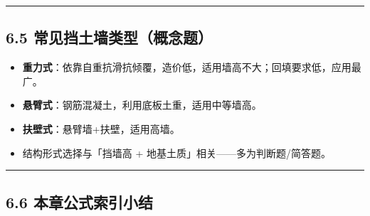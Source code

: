 \documentclass[
]{article}
\providecommand{\tightlist}{%
  \setlength{\itemsep}{0pt}\setlength{\parskip}{0pt}}
\begin{document}
\begin{center}\rule{0.5\linewidth}{0.5pt}\end{center}

\subsection{6.5
常见挡土墙类型（概念题）}\label{ux5e38ux89c1ux6321ux571fux5899ux7c7bux578bux6982ux5ff5ux9898}

\begin{itemize}
\tightlist
\item
  \textbf{重力式}：依靠自重抗滑抗倾覆，造价低，适用墙高不大；回填要求低，应用最广。
\item
  \textbf{悬臂式}：钢筋混凝土，利用底板土重，适用中等墙高。
\item
  \textbf{扶壁式}：悬臂墙+扶壁，适用高墙。
\item
  结构形式选择与「挡墙高 + 地基土质」相关------多为判断题/简答题。
\end{itemize}

\begin{center}\rule{0.5\linewidth}{0.5pt}\end{center}

\subsection{6.6
本章公式索引小结}\label{ux672cux7ae0ux516cux5f0fux7d22ux5f15ux5c0fux7ed3-5}
\end{document}
